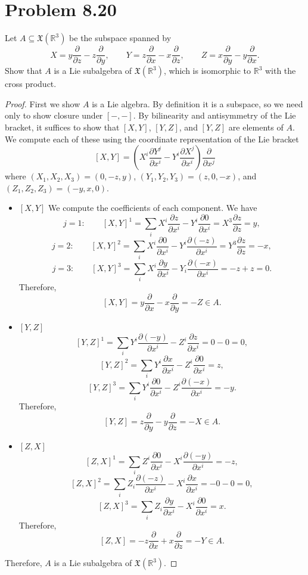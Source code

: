 \documentclass[11pt, letterpaper]{article}
\begin{document}
\section{Problem 8.20}
\begin{problem}
	Let $A\subseteq \mathfrak{X} (\mathbb{R} ^3)$ be the subspace spanned by
	\[
		X=y \frac{\partial }{\partial z} -z \frac{\partial }{\partial y} ,\qquad Y= z \frac{\partial }{\partial x} -x \frac{\partial }{\partial z} ,\qquad Z=x \frac{\partial }{\partial y} -y \frac{\partial }{\partial x} 
	.\]
	Show that $A$ is a Lie subalgebra of $\mathfrak{X} (\mathbb{R} ^3)$, which is isomorphic to $\mathbb{R} ^3$ with the cross product.
\end{problem}
\begin{proof}
	First we show $A$ is a Lie algebra. By definition it is a subspace, so we need only to show closure under $[-,-]$. By bilinearity and antisymmetry of the Lie bracket, it suffices to show that $[X,Y]$, $[Y,Z]$, and $[Y,Z]$ are elements of $A$. We compute each of these using the coordinate representation of the Lie bracket
	\[
		[X,Y]=\left( X^i \frac{\partial Y^j}{\partial x^i} -Y^i \frac{\partial X^j}{\partial x^i}  \right) \frac{\partial }{\partial x^j} 
	\]
	where $(X_1,X_2,X_3)=(0,-z,y)$, $(Y_1,Y_2,Y_3)=(z,0,-x)$, and $(Z_1,Z_2,Z_3)=(-y,x,0)$.
	\begin{itemize}
		\item $[X,Y]$ We compute the coefficients of each component. We have
			\[
				j=1:\qquad [X,Y]^1=\sum_{i} X^i \frac{\partial z}{\partial x^i} -Y^i \frac{\partial 0}{\partial x^i} =X^3\frac{\partial z}{\partial z} =y
			,\]
			\[
				j=2:\qquad [X,Y]^2=\sum_{i} X^i \frac{\partial 0}{\partial x^i} -Y^i \frac{\partial (-z)}{\partial x^i} =Y^3 \frac{\partial z}{\partial z} =-x
			,\]
			\[
				j=3:\qquad [X,Y]^3=\sum_{i} X^i \frac{\partial y}{\partial x^i} -Y_i \frac{\partial (-x)}{\partial x^i} =-z +z=0
			.\]
			Therefore,
			\[
				[X,Y]=y \frac{\partial }{\partial x} -x \frac{\partial }{\partial y} =-Z\in A
			.\]
		\item $[Y,Z]$
			\[
				[Y,Z]^1=\sum_{i} Y^i \frac{\partial (-y)}{\partial x^i} -Z^i \frac{\partial z}{\partial x^i} =0-0=0
			,\]
			\[
				[Y,Z]^2=\sum_{i} Y^i \frac{\partial x}{\partial x^i} -Z^i \frac{\partial 0}{\partial x^i} =z
			,\]
			\[
				[Y,Z]^3=\sum_{i} Y^i \frac{\partial 0}{\partial x^i} -Z^i \frac{\partial (-x)}{\partial x^i} =-y
			.\]
			Therefore,
			\[
				[Y,Z]=z \frac{\partial }{\partial y} -y \frac{\partial }{\partial z} =-X\in A
			.\]
		\item $[Z,X]$ 
			\[
				[Z,X]^1=\sum_{i} Z^i \frac{\partial 0}{\partial x^i} -X^i \frac{\partial (-y)}{\partial x^i} =-z
			,\]
			\[
				[Z,X]^2=\sum_{i} Z_i \frac{\partial (-z)}{\partial x^i} -X^i \frac{\partial x}{\partial x^i} =-0-0=0,
			\]
			\[
				[Z,X]^3=\sum_{i} Z_i \frac{\partial y}{\partial x^i} -X^i \frac{\partial 0}{\partial x^i} =x
			.\]
			Therefore,
			\[
				[Z,X]=-z \frac{\partial }{\partial x} +x \frac{\partial }{\partial z} =-Y\in A
			.\]
	\end{itemize}
	Therefore, $A$ is a Lie subalgebra of $\mathfrak{X} (\mathbb{R} ^3)$.


\end{proof}
\end{document}
